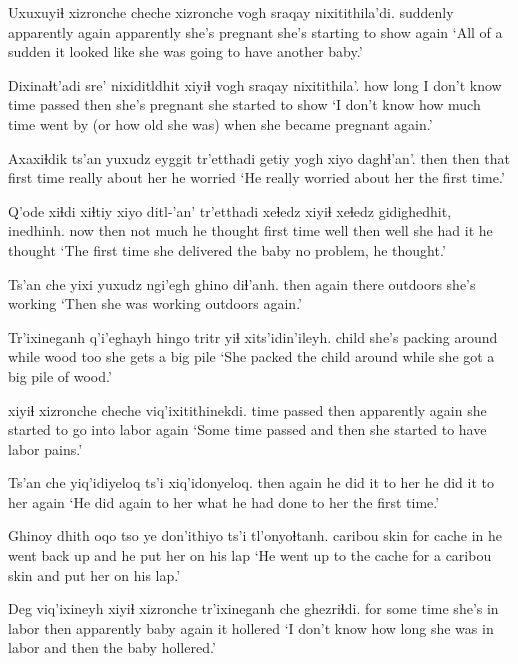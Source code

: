 \documentclass[12pt]{article}
\begin{document}
\gll Uxuxuyiɬ xizronche cheche xizronche {vogh sraqay} nixitithila'di.
suddenly    apparently     again  apparently        {she's pregnant} {she's starting to show again}
\glt `All of a sudden it looked like she was going to have another baby.'
\glend

\gll Dixinaɬt'adi sre'         nixiditldhit           xiyiɬ {vogh sraqay} nixitithila'.
{how long}    {I don't know} {time passed} then  {she's pregnant} {she started to show}
\glt `I don't know how much time went by (or how old she was) when she became pregnant again.'
\glend

\gll Axaxiɬdik ts'an yuxudz eyggit tr'etthadi getiy  yogh          {xiyo daghɬ'an'.}
then      then  {}     that    {first time} really {about her} {he worried}
\glt `He really worried about her the first time.'
\glend

\gll Q'ode xiɬdi xiɬtiy {xiyo ditl-'an'} tr'etthadi xeɬedz xiyiɬ xeɬedz gidighedhit, inedhinh.
now   then {not much} {he thought}     {first time} well then well {she had it}  {he thought}
\glt `The first time she delivered the baby no problem, he thought.'
\glend

\gll Ts'an che yixi  yuxudz ngi'egh  {ghino diɬ'anh.}
then   again  there {} outdoors {she's working }
\glt `Then she was working outdoors again.'
\glend

\gll Tr'ixineganh q'i'eghayh              hingo tritr yiɬ xits'idin'ileyh.
child         {she's packing around} while wood  too  {she gets a big pile}
\glt `She packed the child around while she got a big pile of wood.'
\glend

     xiyiɬ xizronche cheche viq'ixitithinekdi.
{time passed}  then   apparently    again  {she started to go into labor again}
\glt `Some time passed and then she started to have labor pains.'
\glend

\gll Ts'an che yiq'idiyeloq     ts'i xiq'idonyeloq.
then  again {he did it to her} {}  {he did it to her again}
\glt `He did again to her what he had done to her the first time.'
\glend

\gll Ghinoy  dhith oqo tso   ye don'ithiyo      ts'i tl'onyoɬtanh.
caribou skin  for cache in {he went back up} and  {he put her on his lap}
\glt `He went up to the cache for a caribou skin and put her on his lap.'
\glend

\gll Deg viq'ixineyh          xiyiɬ xizronche tr'ixineganh che   ghezriɬdi.
{for some time} {she's in labor} then apparently   baby         again {it hollered}
\glt `I don't know how long she was in labor and then the baby hollered.'
\glend
\end{document}
